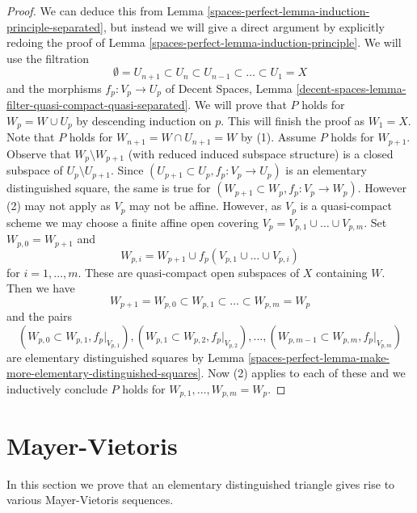 \begin{proof}
We can deduce this from Lemma \ref{spaces-perfect-lemma-induction-principle-separated},
but instead we will give a direct argument by explicitly redoing the proof of
Lemma \ref{spaces-perfect-lemma-induction-principle}. We will use the filtration
$$
\emptyset = U_{n + 1} \subset
U_n \subset U_{n - 1} \subset \ldots \subset U_1 = X
$$
and the morphisms $f_p : V_p \to U_p$ of
Decent Spaces, Lemma
\ref{decent-spaces-lemma-filter-quasi-compact-quasi-separated}.
We will prove that $P$ holds for $W_p = W \cup U_p$ by descending
induction on $p$. This will finish the proof as $W_1 = X$.
Note that $P$ holds for $W_{n + 1} = W \cap U_{n + 1} = W$
by (1). Assume $P$ holds for $W_{p + 1}$. Observe that
$W_p \setminus W_{p + 1}$ (with reduced induced subspace structure)
is a closed subspace of $U_p \setminus U_{p + 1}$.
Since $(U_{p + 1} \subset U_p, f_p : V_p \to U_p)$ is an elementary
distinguished square, the same is true for
$(W_{p + 1} \subset W_p, f_p : V_p \to W_p)$.
However (2) may not apply as $V_p$ may not be affine.
However, as $V_p$ is a quasi-compact scheme we may choose
a finite affine open covering $V_p = V_{p, 1} \cup \ldots \cup V_{p, m}$.
Set $W_{p, 0} = W_{p + 1}$ and
$$
W_{p, i} = W_{p + 1} \cup f_p(V_{p, 1} \cup \ldots \cup V_{p, i})
$$
for $i = 1, \ldots, m$. These are quasi-compact open subspaces of $X$
containing $W$. Then we have
$$
W_{p + 1} = W_{p, 0} \subset
W_{p, 1} \subset \ldots \subset
W_{p, m} = W_p
$$
and the pairs
$$
(W_{p, 0} \subset W_{p, 1}, f_p|_{V_{p, 1}}),
(W_{p, 1} \subset W_{p, 2}, f_p|_{V_{p, 2}}),\ldots,
(W_{p, m - 1} \subset W_{p, m}, f_p|_{V_{p, m}})
$$
are elementary distinguished squares by
Lemma \ref{spaces-perfect-lemma-make-more-elementary-distinguished-squares}.
Now (2) applies to each of these and we inductively
conclude $P$ holds for $W_{p, 1}, \ldots, W_{p, m} = W_p$.
\end{proof}

\section{Mayer-Vietoris}
\label{spaces-perfect-section-mayer-vietoris}
In this section we prove that an elementary distinguished triangle
gives rise to various Mayer-Vietoris sequences.

